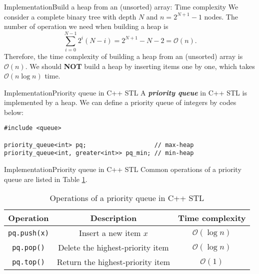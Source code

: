 \documentclass[aspectratio=169]{ctexbeamer}
\newcommand{\highlight}[1]{\textbf{\textit{#1}}}
\begin{document}
    \begin{frame}{Implementation}{Build a heap from an (unsorted) array: Time complexity}
        We consider a complete binary tree with depth $N$ and $n=2^{N+1}-1$ nodes. The number of operation we need when building a heap is
        $$\sum_{i=0}^{N-1}2^i(N-i)=2^{N+1}-N-2=\mathcal O(n).$$
        Therefore, the time complexity of building a heap from an (unsorted) array is $\mathcal O(n)$. We should {\bf NOT} build a heap by inserting items one by one, which takes $\mathcal O(n\log n)$ time.
    \end{frame}

    \begin{frame}[fragile]{Implementation}{Priority queue in C++ STL}
        A \highlight{priority queue} in C++ STL is implemented by a heap. We can define a priority queue of integers by codes below:

        \begin{lstlisting}
#include <queue>

priority_queue<int> pq;                   // max-heap
priority_queue<int, greater<int>> pq_min; // min-heap
        \end{lstlisting}
    \end{frame}

    \begin{frame}{Implementation}{Priority queue in C++ STL}
        Common operations of a priority queue are listed in Table \ref{tab:Operations of a priority queue in C++ STL}.

        \begin{table}[!htbp]
            \centering
            \begin{tabular}{ccc}
                \toprule
                Operation & Description & Time complexity \\
                \midrule
                \texttt{pq.push(x)} & Insert a new item $x$ & $\mathcal O(\log n)$ \\
                \texttt{pq.pop()} & Delete the highest-priority item & $\mathcal O(\log n)$ \\
                \texttt{pq.top()} & Return the highest-priority item & $\mathcal O(1)$ \\
                \bottomrule
            \end{tabular}
            \caption{Operations of a priority queue in C++ STL}
            \label{tab:Operations of a priority queue in C++ STL}
        \end{table}
    \end{frame}
\end{document}
